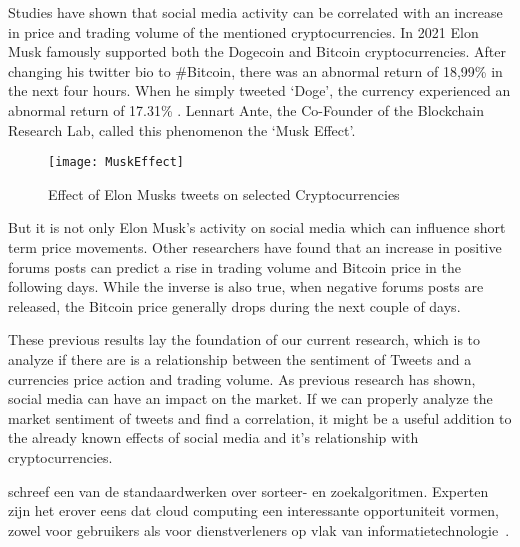 Studies have shown that social media activity can be correlated with an increase in price and trading volume of the mentioned cryptocurrencies.\autocite{Mai2018} In 2021 Elon Musk famously supported both the Dogecoin and Bitcoin cryptocurrencies. After changing his twitter bio to \#Bitcoin, there was an abnormal return of 18,99\% in the next four hours. When he simply tweeted ‘Doge’, the currency experienced an abnormal return of 17.31\% \autocite{Ante2022}. Lennart Ante, the Co-Founder of the Blockchain Research Lab, called this phenomenon the ‘Musk Effect’.\autocite{Ante2022} \bigbreak

\begin{figure} [h]
    \centering
    \texttt{[image: MuskEffect]}
    \caption{Effect of Elon Musks tweets on selected Cryptocurrencies}
    \autocite{Ante2022}
\end{figure}


But it is not only Elon Musk’s activity on social media which can influence short term price movements. Other researchers have found that an increase in positive forums posts can predict a rise in trading volume and Bitcoin price in the following days. While the inverse is also true, when negative forums posts are released, the Bitcoin price generally drops during the next couple of days.\autocite{Mai2018} \bigbreak

These previous results lay the foundation of our current research, which is to analyze if there are is a relationship between the sentiment of Tweets and a currencies price action and trading volume. As previous research has shown, social media can have an impact on the market. If we can properly analyze the market sentiment of tweets and find a correlation, it might be a useful addition to the already known effects of social media and it’s relationship with cryptocurrencies. \autocite{Coingecko2023a} \bigbreak  

\textcite{Knuth1998} schreef een van de standaardwerken over sorteer- en zoekalgoritmen. Experten zijn het erover eens dat cloud computing een interessante opportuniteit vormen, zowel voor gebruikers als voor dienstverleners op vlak van informatietechnologie~\autocite{Creeger2009}.


